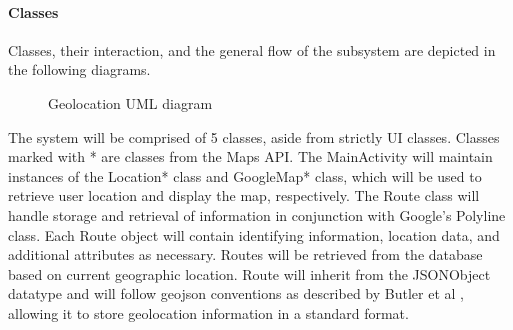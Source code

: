 \documentclass{article}
\begin{document}
\paragraph{Classes}
Classes, their interaction, and the general flow of the subsystem are depicted in the following diagrams.

\begin{figure}[H]
    \centering
    \begin{center}
    \end{center}
    \caption{Geolocation UML diagram}
    \label{fig:my_label}
\end{figure}

The system will be comprised of 5 classes, aside from strictly UI classes. Classes marked with * are classes from the Maps API. The MainActivity will maintain instances of the Location* class and GoogleMap* class, which will be used to retrieve user location and display the map, respectively. The Route class will handle storage and retrieval of information in conjunction with Google's Polyline class. Each Route object will contain identifying information, location data, and additional attributes as necessary. Routes will be retrieved from the database based on current geographic location. Route will inherit from the JSONObject datatype and will follow geojson conventions as described by Butler et al \cite{g_geojson_std}, allowing it to store geolocation information in a standard format.
\end{document}
